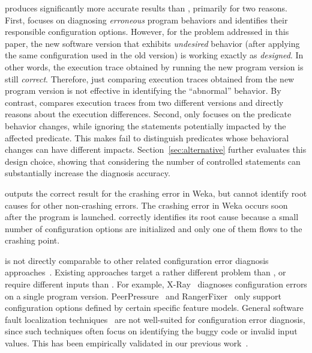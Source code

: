 \ourtool produces significantly more accurate results than \prevtool,
primarily for two reasons. First, \prevtool focuses on diagnosing
\textit{erroneous} program behaviors and identifies their responsible
configuration options. However, for the problem addressed in this paper,
the new software version that exhibits \textit{undesired} behavior 
(after applying the same configuration used in the old version)
is working exactly as \textit{designed}. In other words, the execution
trace obtained by running the new program version is still
\textit{correct}. Therefore, just comparing execution traces obtained
from the new program version is not effective in identifying
the ``abnormal'' behavior. By contrast, \ourtool compares execution
traces from two different versions and directly reasons about the
execution differences. Second, \prevtool only focuses on
the predicate behavior changes, while ignoring the statements
potentially impacted by the affected predicate. This makes
\prevtool fail to distinguish predicates whose behavioral changes can
have different impacts.
Section~\ref{sec:alternative} further evaluates this design
choice, showing that considering the number of controlled statements
can substantially increase the diagnosis accuracy.

\conftool outputs the correct result for the crashing error in Weka,
but cannot identify root causes for other non-crashing errors.
The crashing error in Weka occurs soon after the program
is launched. \conftool correctly identifies its root cause because
a small number of configuration options
are initialized and only one of them flows to the crashing point.



\ourtool is not directly comparable to other related
configuration error diagnosis approaches~\cite{Attariyan:2010:ACT,
xray, Whitaker:2004:CDS, Su:2007:AIC, Wang:2004:AMT, rangefix}.
Existing approaches target a rather
different problem than \ourtool, or require different
inputs than \ourtool. For example, 
X-Ray~\cite{xray} diagnoses configuration errors on a single
program version.
PeerPressure~\cite{Wang:2004:AMT} and RangerFixer~\cite{rangefix} only
support configuration options defined by certain
specific feature models. 
General software fault localization techniques~\cite{Jones:2002, McCamant:2003}
are not well-suited for configuration error diagnosis, since such techniques
often focus on identifying the buggy code or
invalid input values. This has been empirically
validated in our previous work~\cite{Zhang:2013:ADS}.


